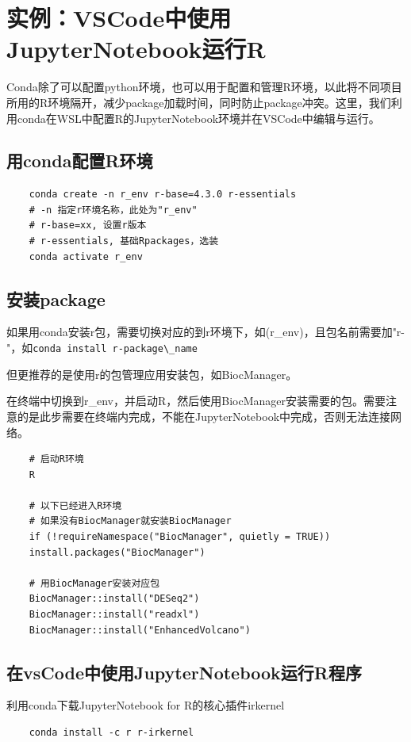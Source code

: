 \section{实例：VSCode中使用JupyterNotebook运行R}
Conda除了可以配置python环境，也可以用于配置和管理R环境，以此将不同项目所用的R环境隔开，减少package加载时间，同时防止package冲突。这里，我们利用conda在WSL中配置R的JupyterNotebook环境并在VSCode中编辑与运行。

\subsection{用conda配置R环境}
\begin{lstlisting}
    conda create -n r_env r-base=4.3.0 r-essentials
    # -n 指定r环境名称，此处为"r_env"
    # r-base=xx, 设置r版本
    # r-essentials, 基础Rpackages，选装
    conda activate r_env
\end{lstlisting}

\subsection{安装package}
如果用conda安装r包，需要切换对应的到r环境下，如(r\_env)，且包名前需要加"r-"，如\lstinline{conda install r-package\_name}

但更推荐的是使用r的包管理应用安装包，如BiocManager。

在终端中切换到r\_env，并启动R，然后使用BiocManager安装需要的包。需要注意的是此步需要在终端内完成，不能在JupyterNotebook中完成，否则无法连接网络。

\begin{lstlisting}
    # 启动R环境
    R

    # 以下已经进入R环境
    # 如果没有BiocManager就安装BiocManager
    if (!requireNamespace("BiocManager", quietly = TRUE))
    install.packages("BiocManager")

    # 用BiocManager安装对应包
    BiocManager::install("DESeq2")
    BiocManager::install("readxl")
    BiocManager::install("EnhancedVolcano")
\end{lstlisting}

\subsection{在vsCode中使用JupyterNotebook运行R程序}
利用conda下载JupyterNotebook for R的核心插件irkernel

\begin{lstlisting}
    conda install -c r r-irkernel
\end{lstlisting}

